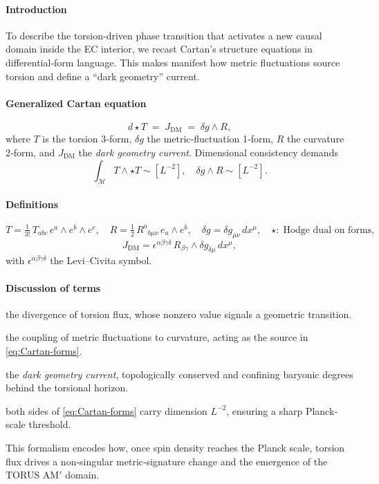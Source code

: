 \documentclass{article}
\begin{document}
\paragraph{Introduction}
To describe the torsion‐driven phase transition that activates a new causal domain inside the EC interior, we recast Cartan’s structure equations in differential‐form language.  This makes manifest how metric fluctuations source torsion and define a “dark geometry” current.

\paragraph{Generalized Cartan equation}
\begin{equation}\label{eq:Cartan-forms}
  d\star T \;=\; J_{\mathrm{DM}} \;=\;\delta g\wedge R,
\end{equation}
where $T$ is the torsion 3‐form, $\delta g$ the metric‐fluctuation 1‐form, $R$ the curvature 2‐form, and $J_{\mathrm{DM}}$ the \emph{dark geometry current}.  Dimensional consistency demands
\[
  \int_{\mathcal M}T\wedge\star T \sim [L^{-2}], 
  \quad
  \delta g\wedge R \sim [L^{-2}].
\]

\paragraph{Definitions}
\[
  T = \tfrac{1}{3!}\,T_{abc}\,e^a\wedge e^b\wedge e^c,
  \quad
  R = \tfrac{1}{2}\,R^a{}_{b\mu\nu}\,e_a\wedge e^b,
  \quad
  \delta g = \delta g_{\mu\nu}\,dx^\mu,
  \quad
  \star\colon\;\text{Hodge dual on forms},
\]
\[
  J_{\mathrm{DM}}
    = \epsilon^{\alpha\beta\gamma\delta}\,
      R_{\beta\gamma}\wedge\delta g_{\delta\mu}\,dx^\mu,
\]
with $\epsilon^{\alpha\beta\gamma\delta}$ the Levi–Civita symbol.

\paragraph{Discussion of terms}
\begin{description}[leftmargin=2em]
  \item[$d\star T$] the divergence of torsion flux, whose nonzero value signals a geometric transition.
  \item[$\delta g\wedge R$] the coupling of metric fluctuations to curvature, acting as the source in \eqref{eq:Cartan-forms}.
  \item[$J_{\mathrm{DM}}$] the \emph{dark geometry current}, topologically conserved and confining baryonic degrees behind the torsional horizon.
  \item[Dimensional balance] both sides of \eqref{eq:Cartan-forms} carry dimension $L^{-2}$, ensuring a sharp Planck‐scale threshold.
  \item[Physical role] This formalism encodes how, once spin density reaches the Planck scale, torsion flux drives a non‐singular metric‐signature change and the emergence of the TORUS AM$'$ domain.
\end{description}
\end{document}
